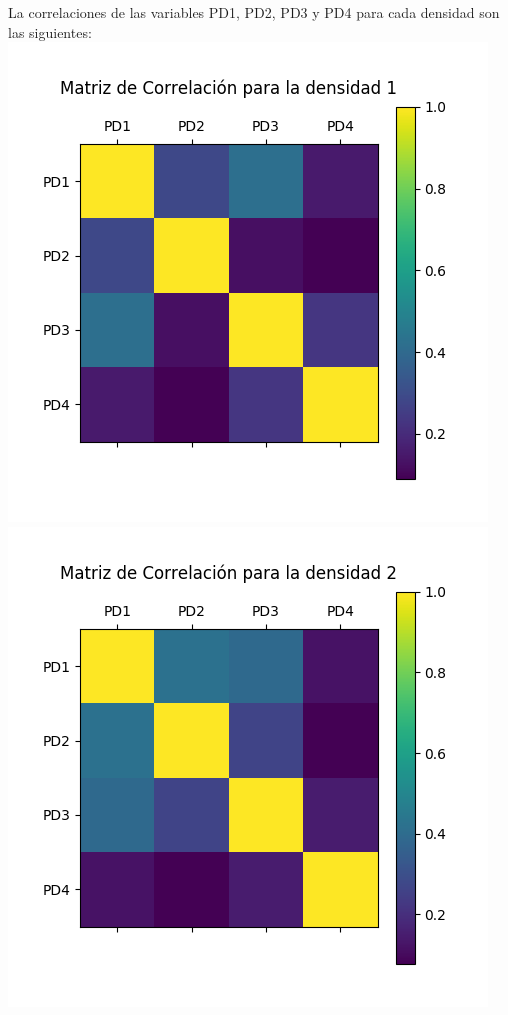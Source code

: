 La correlaciones de las variables PD1, PD2, PD3 y PD4 para cada densidad son las siguientes:
\includegraphics[scale=0.5]{correlacionD1.jpg}
\includegraphics[scale=0.5]{correlacionD2.jpg} \\

